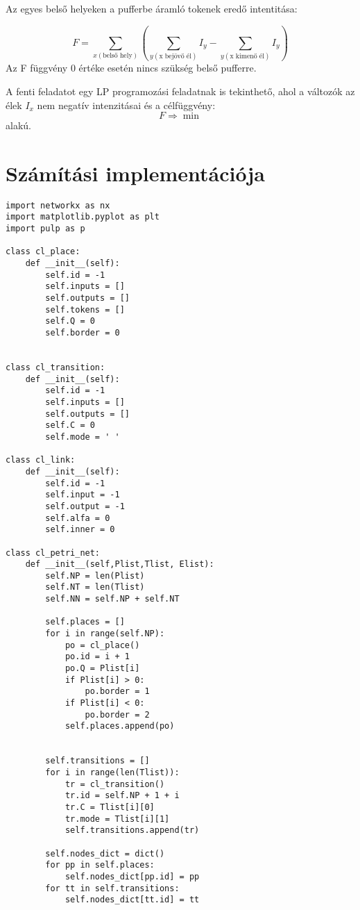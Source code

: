 Az egyes belső helyeken a pufferbe áramló tokenek  eredő intentitása:

$$F= \sum_{x(\text{belső hely})} \left( \sum_{y(\text{x bejövő él})} I_y - \sum_{y(\text{x kimenő él})} I_y \right)$$
Az F függvény 0 értéke esetén nincs szükség belső pufferre.

A fenti feladatot egy LP programozási feladatnak is tekinthető, ahol a változók az élek $I_x$ nem negatív intenzitásai és a célfüggvény:
$$F\Rightarrow \min$$ alakú.

\section{Számítási implementációja}
\begin{verbatim}
import networkx as nx
import matplotlib.pyplot as plt
import pulp as p

class cl_place:
    def __init__(self):
        self.id = -1
        self.inputs = []
        self.outputs = []
        self.tokens = []
        self.Q = 0
        self.border = 0


class cl_transition:
    def __init__(self):
        self.id = -1
        self.inputs = []
        self.outputs = []
        self.C = 0
        self.mode = ' '

class cl_link:
    def __init__(self):
        self.id = -1
        self.input = -1
        self.output = -1
        self.alfa = 0
        self.inner = 0

class cl_petri_net:
    def __init__(self,Plist,Tlist, Elist):
        self.NP = len(Plist)
        self.NT = len(Tlist)
        self.NN = self.NP + self.NT
            
        self.places = []
        for i in range(self.NP):
            po = cl_place()
            po.id = i + 1
            po.Q = Plist[i]
            if Plist[i] > 0:
                po.border = 1
            if Plist[i] < 0:
                po.border = 2            
            self.places.append(po)
            
       
        self.transitions = []
        for i in range(len(Tlist)):
            tr = cl_transition()
            tr.id = self.NP + 1 + i
            tr.C = Tlist[i][0]
            tr.mode = Tlist[i][1]
            self.transitions.append(tr)
        
        self.nodes_dict = dict()
        for pp in self.places:
            self.nodes_dict[pp.id] = pp
        for tt in self.transitions:
            self.nodes_dict[tt.id] = tt
        

\end{verbatim}
